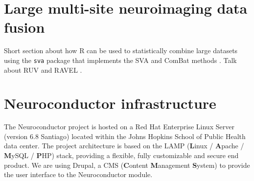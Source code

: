 \documentclass[]{elsarticle} %
\begin{document}
\section{Large multi-site neuroimaging data fusion}\label{sec:datafusion}
Short section about how R can be used to statistically combine large datasets using the \texttt{sva} package \citep{svapackage} that implements the SVA and ComBat methods \citep{combat}. Talk about RUV and RAVEL \citep{ravel}. 

\section{Neuroconductor infrastructure}\label{sec:backend}
The Neuroconductor project is hosted on a Red Hat Enterprise Linux Server (version 6.8 Santiago) located within the Johns Hopkins School of Public Health data center. The project architecture is based on the LAMP (\textbf{L}inux / \textbf{A}pache / \textbf{M}ySQL / \textbf{P}HP) stack, providing a flexible, fully customizable and secure end product. We are using Drupal, a CMS (\textbf{C}ontent \textbf{M}anagement \textbf{S}ystem) to provide the user interface to the Neuroconductor module. 
\end{document}
